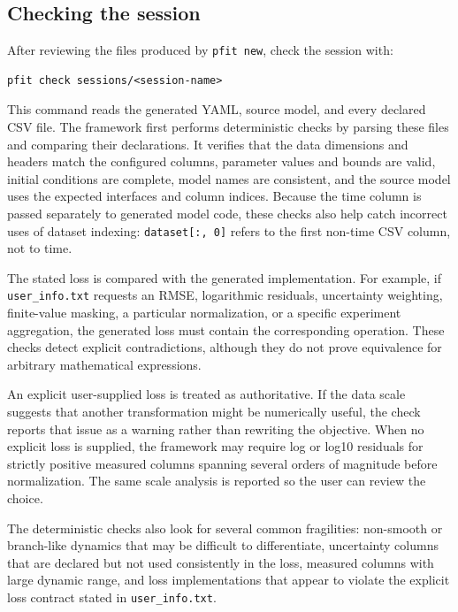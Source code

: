 \subsection{Checking the session}

After reviewing the files produced by \texttt{pfit new}, check the session with:

\begin{verbatim}
pfit check sessions/<session-name>
\end{verbatim}

This command reads the generated YAML, source model, and every declared CSV
file. The framework first performs deterministic checks by parsing these files
and comparing their declarations. It verifies that the data dimensions and
headers match the configured columns, parameter values and bounds are valid,
initial conditions are complete, model names are consistent, and the source
model uses the expected interfaces and column indices. Because the time column
is passed separately to generated model code, these checks also help catch
incorrect uses of dataset indexing: \texttt{dataset[:, 0]} refers to the first
non-time CSV column, not to time.

The stated loss is compared with the generated implementation. For example, if
\texttt{user\_info.txt} requests an RMSE, logarithmic residuals, uncertainty
weighting, finite-value masking, a particular normalization, or a specific
experiment aggregation, the generated loss must contain the corresponding
operation. These checks detect explicit contradictions, although they do not
prove equivalence for arbitrary mathematical expressions.

An explicit user-supplied loss is treated as authoritative. If the data scale
suggests that another transformation might be numerically useful, the check
reports that issue as a warning rather than rewriting the objective. When no
explicit loss is supplied, the framework may require log or log10 residuals for
strictly positive measured columns spanning several orders of magnitude before
normalization. The same scale analysis is reported so the user can review the
choice.

The deterministic checks also look for several common fragilities: non-smooth
or branch-like dynamics that may be difficult to differentiate, uncertainty
columns that are declared but not used consistently in the loss, measured
columns with large dynamic range, and loss implementations that appear to
violate the explicit loss contract stated in \texttt{user\_info.txt}.

